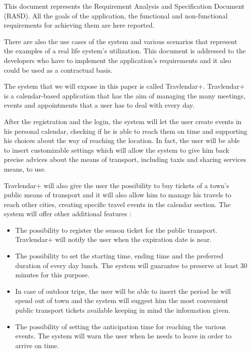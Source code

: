 \vspace*{-5mm}

This document represents the Requirement Analysis and Specification Document (RASD).
All the goals of the application, the functional and non-functional requirements for achieving them are here reported.\par
There are also the use cases of the system and various scenarios that represent the examples of a real life system’s utilization.
This document is addressed to the developers who have to implement the application’s requirements and it also could be used as a contractual basis.

The system that we will expose in this paper is called Travlendar+. 
Travlendar+ is a calendar-based application that has the aim of managing the many meetings, events and appointments that a user has to deal with every day.\par
After the registration and the login, the system will let the user create events in his personal calendar, checking if he is able to reach them on time and supporting his choices about the way of reaching the location. In fact, the user will be able to insert customizable settings which will allow the system to give him back precise advices about the means of transport, including taxis and sharing services means, to use.\par
Travlendar+ will also give the user the possibility to buy tickets of a town’s public means of transport and it will also allow him to manage his travels to reach other cities, creating specific travel events in the calendar section.
The system will offer other additional features :
\begin{itemize}
	\setlength{\leftskip}{0.5cm}
	\item The possibility to register the season ticket for the public transport. Travlendar+ will notify the user when the expiration date is near.
	\item The possibility to set the starting time, ending time and the preferred duration of every day lunch. The system will guarantee to preserve at least 30 minutes for this purpose.
	\item In case of outdoor trips, the user will be able to insert the period he will spend out of town and the system will suggest him the most convenient public transport tickets available keeping in mind the information given.
	\item The possibility of setting the anticipation time for reaching the various events. The system will warn the user when he needs to leave in order to arrive on time.
\end{itemize}


